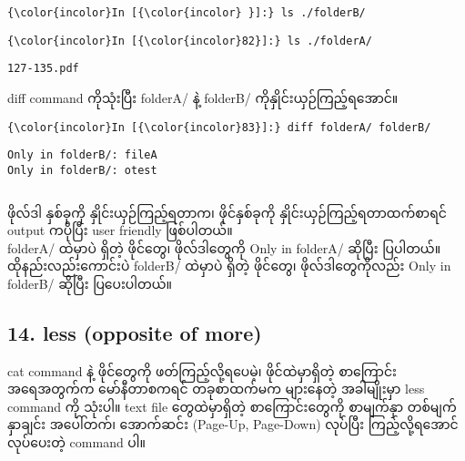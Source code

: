 \documentclass[11pt]{article}
\begin{document}
    \begin{Verbatim}[commandchars=\\\{\}]
{\color{incolor}In [{\color{incolor} }]:} ls ./folderB/
\end{Verbatim}

    \begin{Verbatim}[commandchars=\\\{\}]
{\color{incolor}In [{\color{incolor}82}]:} ls ./folderA/
\end{Verbatim}

    \begin{Verbatim}[commandchars=\\\{\}]
127-135.pdf

    \end{Verbatim}

    diff command ကိုသုံးပြီး folderA/ နဲ့ folderB/
ကိုနှိုင်းယှဉ်ကြည့်ရအောင်။

    \begin{Verbatim}[commandchars=\\\{\}]
{\color{incolor}In [{\color{incolor}83}]:} diff folderA/ folderB/
\end{Verbatim}

    \begin{Verbatim}[commandchars=\\\{\}]
Only in folderB/: fileA
Only in folderB/: otest

    \end{Verbatim}

    \begin{Verbatim}[commandchars=\\\{\}]

    \end{Verbatim}

    ဖိုလ်ဒါ နှစ်ခုကို နှိုင်းယှဉ်ကြည့်ရတာက၊ ဖိုင်နှစ်ခုကို
နှိုင်းယှဉ်ကြည့်ရတာထက်စာရင် output ကပိုပြီး user friendly ဖြစ်ပါတယ်။\\
folderA/ ထဲမှာပဲ ရှိတဲ့ ဖိုင်တွေ၊ ဖိုလ်ဒါတွေကို Only in folderA/ ဆိုပြီး
ပြပါတယ်။\\
ထိုနည်းလည်းကောင်းပဲ folderB/ ထဲမှာပဲ ရှိတဲ့ ဖိုင်တွေ၊ ဖိုလ်ဒါတွေကိုလည်း
Only in folderB/ ဆိုပြီး ပြပေးပါတယ်။

    \subsection{14. less (opposite of more)}\label{less-opposite-of-more}

cat command နဲ့ ဖိုင်တွေကို ဖတ်ကြည့်လို့ရပေမဲ့၊ ဖိုင်ထဲမှာရှိတဲ့
စာကြောင်းအရေအတွက်က မော်နီတာစကရင် တခုစာထက်မက များနေတဲ့ အခါမျိုးမှာ less
command ကို သုံးပါ။ text file တွေထဲမှာရှိတဲ့ စာကြောင်းတွေကို စာမျက်နှာ
တစ်မျက်နှာချင်း အပေါ်တက်၊ အောက်ဆင်း (Page-Up, Page-Down) လုပ်ပြီး
ကြည့်လို့ရအောင် လုပ်ပေးတဲ့ command ပါ။
\end{document}
